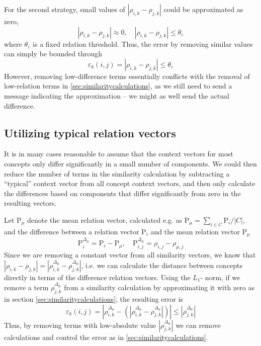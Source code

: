 \documentclass{sig-alternate}
\newcommand{\Rho}{\mathrm{P}}
\newcommand{\rn}[1]{\rho_{#1}}
\newcommand{\rv}{\Rho}
\begin{document}
For the second strategy, small values of $|\rn{i,k}-\rn{j,k}|$ could be approximated as zero,
\begin{equation}
| \rn{i,k} - \rn{j,k} | \approx 0, \quad | \rn{i,k} - \rn{j,k} | \leq \theta_\varepsilon
\end{equation}
where $\theta_\varepsilon$ is a fixed relation threshold. Thus, the error by removing similar values can simply be bounded through
\begin{equation}
\varepsilon_k(i,j) = | \rn{i,k} - \rn{j,k} | \leq \theta_\varepsilon
\end{equation}
However, removing low-difference terms essentially conflicts
with the removal of low-relation terms in \ref{sec:similaritycalculations}, as we still need to send a message
indicating the approximation -- we might as well send the
actual difference.


\subsection{Utilizing typical relation vectors}

It is in many cases reasonable to assume that the context vectors for most concepts only differ
significantly in a small number of components. We could then reduce the number of terms
in the similarity calculation by subtracting a ``typical''
context vector from all concept context vectors, and then only calculate the differences based on
components that differ significantly from zero in the resulting vectors.

Let $\rv_{\mu}$ denote the mean relation vector, calculated e.g. as
$\rv_{\mu} = \sum_{i \in C} \rv_i / |C|$,
and the difference between a relation vector $\rv_i$ and the mean relation vector $\rv_\mu$
\begin{equation}
\rv_i^{\Delta_\mu} = \rv_i - \rv_\mu , \quad  \rv_{i, j}^{\Delta_\mu} = \rn{i, j} - \rn{\mu, j}
\end{equation}
Since we are removing a constant vector from all similarity vectors, we know that
$| \rn{i,k} - \rn{j,k} | = | \rn{i, k}^{\Delta_\mu} - \rn{j, k}^{\Delta_\mu} |$,
i.e. we can calculate the distance between concepts directly in terms of the difference relation vectors. Using the $L_1$-
norm, if we remove a term $\rn{j,k}^{\Delta_\mu}$ from a similarity calculation by approximating it with zero as in section \ref{sec:similaritycalculations}, the resulting error is
\begin{equation}
\varepsilon_k(i, j) = | \rn{i,k}^{\Delta_\mu} - (| \rn{i,k}^{\Delta_\mu} - \rn{j,k}^{\Delta_\mu} | ) |
\leq | \rn{j,k}^{\Delta_\mu}|
\end{equation}
Thus, by removing terms with low-absolute value $|\rn{j,k}^{\Delta_\mu}|$ we can remove calculations and control the
error as in \ref{sec:similaritycalculations}.
\end{document}

